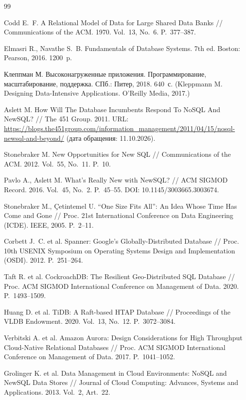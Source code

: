 \documentclass{misisarticle}
\begin{document}
\begin{thebibliography}{99}

 Codd E.~F. A Relational Model of Data for Large Shared Data Banks // Communications of the ACM. 1970. Vol.~13, No.~6. P.~377--387.

 Elmasri R., Navathe S.~B. Fundamentals of Database Systems. 7th ed. Boston: Pearson, 2016. 1200~p.

 Клеппман М. Высоконагруженные приложения. Программирование, масштабирование, поддержка. СПб.: Питер, 2018. 640~с. (Kleppmann M. Designing Data-Intensive Applications. O'Reilly Media, 2017.)

 Aslett M. How Will The Database Incumbents Respond To NoSQL And NewSQL? // The 451 Group. 2011. URL: \url{https://blogs.the451group.com/information_management/2011/04/15/nosql-newsql-and-beyond/} (дата обращения: 11.10.2026).

 Stonebraker M. New Opportunities for New SQL // Communications of the ACM. 2012. Vol.~55, No.~11. P.~10.

 Pavlo A., Aslett M. What's Really New with NewSQL? // ACM SIGMOD Record. 2016. Vol.~45, No.~2. P.~45--55. DOI: 10.1145/3003665.3003674.

 Stonebraker M., \c{C}etintemel U. ``One Size Fits All'': An Idea Whose Time Has Come and Gone // Proc. 21st International Conference on Data Engineering (ICDE). IEEE, 2005. P.~2--11.

 Corbett J.~C. et al. Spanner: Google's Globally-Distributed Database // Proc. 10th USENIX Symposium on Operating Systems Design and Implementation (OSDI). 2012. P.~251--264.

 Taft R. et al. CockroachDB: The Resilient Geo-Distributed SQL Database // Proc. ACM SIGMOD International Conference on Management of Data. 2020. P.~1493--1509.

 Huang D. et al. TiDB: A Raft-based HTAP Database // Proceedings of the VLDB Endowment. 2020. Vol.~13, No.~12. P.~3072--3084.

 Verbitski A. et al. Amazon Aurora: Design Considerations for High Throughput Cloud-Native Relational Databases // Proc. ACM SIGMOD International Conference on Management of Data. 2017. P.~1041--1052.

 Grolinger K. et al. Data Management in Cloud Environments: NoSQL and NewSQL Data Stores // Journal of Cloud Computing: Advances, Systems and Applications. 2013. Vol.~2, Art.~22.


\end{thebibliography}
\end{document}
